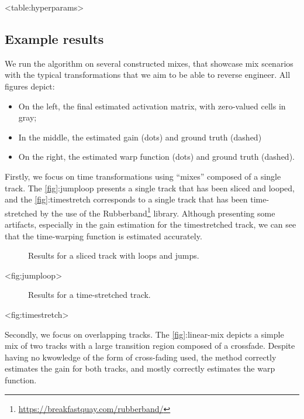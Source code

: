 \textless table:hyperparams\textgreater{}

\subsection{Example results}

We run the algorithm on several constructed mixes, that showcase mix
scenarios with the typical transformations that we aim to be able to
reverse engineer. All figures depict:

\begin{itemize}
\item
  On the left, the final estimated activation matrix, with zero-valued
  cells in gray;
\item
  In the middle, the estimated gain (dots) and ground truth (dashed)
\item
  On the right, the estimated warp function (dots) and ground truth
  (dashed).
\end{itemize}

Firstly, we focus on time transformations using ``mixes'' composed of a
single track. The \hyperref[fig]{{[}fig{]}}:jumploop presents a single
track that has been sliced and looped, and the
\hyperref[fig]{{[}fig{]}}:timestretch corresponds to a single track that
has been time-stretched by the use of the Rubberband\footnote{\url{https://breakfastquay.com/rubberband/}}
library. Although presenting some artifacts, especially in the gain
estimation for the timestretched track, we can see that the time-warping
function is estimated accurately.

\begin{figure}
\centering

\caption{Results for a sliced track with loops and jumps.}
\end{figure}

\textless fig:jumploop\textgreater{}

\begin{figure}
\centering

\caption{Results for a time-stretched track.}
\end{figure}

\textless fig:timestretch\textgreater{}

Secondly, we focus on overlapping tracks. The
\hyperref[fig]{{[}fig{]}}:linear-mix depicts a simple mix of two tracks
with a large transition region composed of a crossfade. Despite having
no kwowledge of the form of cross-fading used, the method correctly
estimates the gain for both tracks, and mostly correctly estimates the
warp function.

